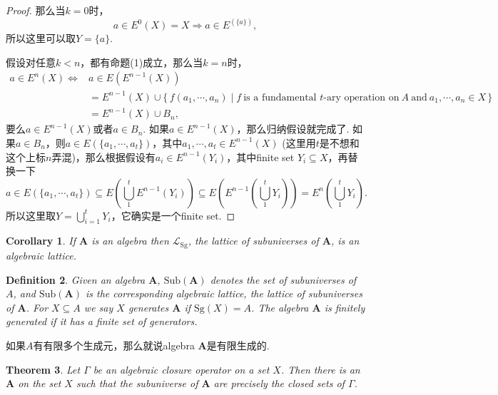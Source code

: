 \documentclass{article}
\newtheorem{theorem}{Theorem}[section]
\newtheorem{corollary}[theorem]{Corollary}
\newtheorem{definition}[theorem]{Definition}
\newcommand\Set[2]{\{\,#1\mid#2\,\}} %
\newcommand\Sg{\text{Sg}}
\newcommand\algebra{\mathbf{A}}
\newcommand\Sub[1]{\text{Sub}(#1)}
\begin{document}
\begin{proof}
那么当$k=0$时，
$$
a \in E^0(X) = X  \Rightarrow a \in E^(\{a\}),
$$
所以这里可以取$Y = \{a\}$.

假设对任意$k < n$，都有命题(1)成立，那么当$k=n$时，
$$
\begin{aligned}
a \in E^n(X) \Leftrightarrow& a \in E(E^{n-1}(X))\\ &= E^{n-1}(X) \cup \Set{f(a_1,\cdots,a_n)}{f\ \text{is a fundamental $t$-ary operation on}\ A\ \text{and}\ a_1,\cdots,a_n \in X}\\ &= E^{n-1}(X) \cup B_n,
\end{aligned}
$$
要么$a \in E^{n-1}(X)$或者$a \in B_n$. 如果$a \in E^{n-1}(X)$，那么归纳假设就完成了. 如果$a \in B_n$，则$a \in E(\{a_1,\cdots,a_t\})$，其中$a_1,\cdots,a_t \in E^{n-1}(X)$ (这里用$t$是不想和这个上标$n$弄混)，那么根据假设有$a_i \in E^{n-1}(Y_i)$，其中finite set $Y_i \subseteq X$，再替换一下
$$
a \in E(\{a_1,\cdots,a_t\}) \subseteq  E(\bigcup\limits_{1}^{t} E^{n-1}(Y_i))  \subseteq E(E^{n-1}(\bigcup\limits_{1}^{t} Y_i)) = E^n(\bigcup\limits_{1}^{t} Y_i).
$$
所以这里取$Y = \bigcup\limits_{i=1}^{t} Y_i$，它确实是一个finite set.

\end{proof}

\begin{corollary}
\rm If $\mathbf{A}$ is an algebra then $\mathcal{L}_{\Sg}$, the lattice of subuniverses of $\mathbf{A}$, is an algebraic lattice.
\end{corollary}

\newpage
\begin{definition}
\rm Given an algebra $\algebra$, {\color{red} $\Sub{\algebra}$} denotes the set of subuniverses of $A$, and $\Sub{\algebra}$ is the corresponding algebraic lattice, the lattice of subuniverses of $\algebra$. For $X \subseteq A$ we say $X$ generates $\algebra$ if $\Sg(X) = A$. The algebra $\algebra$ is finitely generated if it has a finite set of generators.
\end{definition}

{\color{blue} 如果$A$有有限多个生成元，那么就说algebra $\algebra$是有限生成的}.


\begin{theorem}
\rm Let $\Gamma$ be an algebraic closure operator on a set $X$. Then there is an $\algebra$ on the set $X$ such that the subuniverse of $\algebra$ are precisely the closed sets of $\Gamma$.
\end{theorem}
\end{document}

